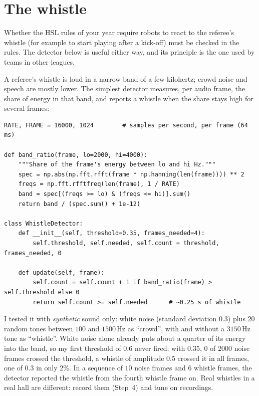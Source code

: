 \section*{The whistle}
\begin{guessbox}
Whether the HSL rules of your year require robots to react to the referee's whistle (for example to start playing after a kick-off) must be checked in the rules\guess. The detector below is useful either way, and its principle is the one used by teams in other leagues.
\end{guessbox}
A referee's whistle is loud in a narrow band of a few kilohertz; crowd noise and speech are mostly lower. The simplest detector measures, per audio frame, the share of energy in that band, and reports a whistle when the share stays high for several frames:
\begin{verbatim}
RATE, FRAME = 16000, 1024        # samples per second, per frame (64 ms)

def band_ratio(frame, lo=2000, hi=4000):
    """Share of the frame's energy between lo and hi Hz."""
    spec = np.abs(np.fft.rfft(frame * np.hanning(len(frame)))) ** 2
    freqs = np.fft.rfftfreq(len(frame), 1 / RATE)
    band = spec[(freqs >= lo) & (freqs <= hi)].sum()
    return band / (spec.sum() + 1e-12)

class WhistleDetector:
    def __init__(self, threshold=0.35, frames_needed=4):
        self.threshold, self.needed, self.count = threshold, frames_needed, 0

    def update(self, frame):
        self.count = self.count + 1 if band_ratio(frame) > self.threshold else 0
        return self.count >= self.needed      # ~0.25 s of whistle
\end{verbatim}
I tested it with \emph{synthetic} sound only: white noise (standard deviation $0.3$) plus $20$ random tones between $100$ and $1500$\,Hz as ``crowd'', with and without a $3150$\,Hz tone as ``whistle''. White noise alone already puts about a quarter of its energy into the band, so my first threshold of $0.6$ never fired; with $0.35$, $0$ of $2000$ noise frames crossed the threshold, a whistle of amplitude $0.5$ crossed it in all frames, one of $0.3$ in only $2\%$. In a sequence of $10$ noise frames and $6$ whistle frames, the detector reported the whistle from the fourth whistle frame on. Real whistles in a real hall are different: record them (Step~4) and tune on recordings.

